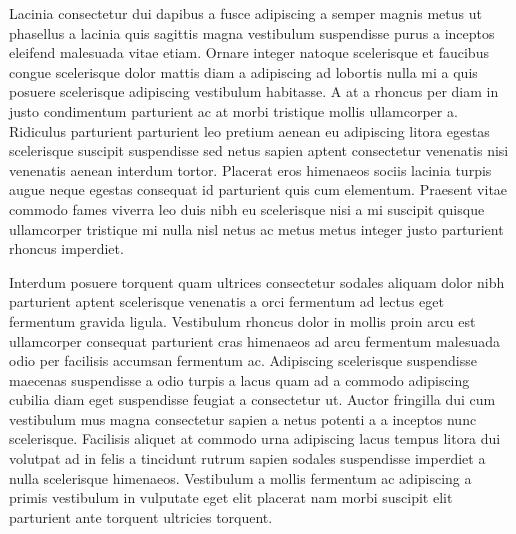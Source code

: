 Lacinia consectetur dui dapibus a fusce adipiscing a semper magnis metus ut phasellus a lacinia quis sagittis magna vestibulum suspendisse purus a inceptos eleifend malesuada vitae etiam. Ornare integer natoque scelerisque et faucibus congue scelerisque dolor mattis diam a adipiscing ad lobortis nulla mi a quis posuere scelerisque adipiscing vestibulum habitasse. A at a rhoncus per diam in justo condimentum parturient ac at morbi tristique mollis ullamcorper a. Ridiculus parturient parturient leo pretium aenean eu adipiscing litora egestas scelerisque suscipit suspendisse sed netus sapien aptent consectetur venenatis nisi venenatis aenean interdum tortor. Placerat eros himenaeos sociis lacinia turpis augue neque egestas consequat id parturient quis cum elementum. Praesent vitae commodo fames viverra leo duis nibh eu scelerisque nisi a mi suscipit quisque ullamcorper tristique mi nulla nisl netus ac metus metus integer justo parturient rhoncus imperdiet. 
\par
Interdum posuere torquent quam ultrices consectetur sodales aliquam dolor nibh parturient aptent scelerisque venenatis a orci fermentum ad lectus eget fermentum gravida ligula. Vestibulum rhoncus dolor in mollis proin arcu est ullamcorper consequat parturient cras himenaeos ad arcu fermentum malesuada odio per facilisis accumsan fermentum ac. Adipiscing scelerisque suspendisse maecenas suspendisse a odio turpis a lacus quam ad a commodo adipiscing cubilia diam eget suspendisse feugiat a consectetur ut. Auctor fringilla dui cum vestibulum mus magna consectetur sapien a netus potenti a a inceptos nunc scelerisque. Facilisis aliquet at commodo urna adipiscing lacus tempus litora dui volutpat ad in felis a tincidunt rutrum sapien sodales suspendisse imperdiet a nulla scelerisque himenaeos. Vestibulum a mollis fermentum ac adipiscing a primis vestibulum in vulputate eget elit placerat nam morbi suscipit elit parturient ante torquent ultricies torquent. 

